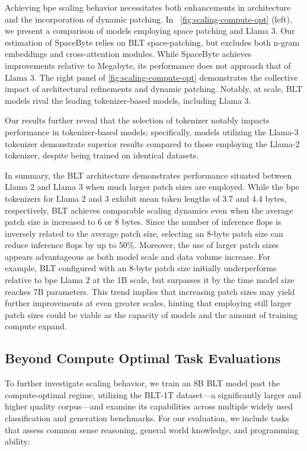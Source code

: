Achieving bpe scaling behavior necessitates both enhancements in architecture and the incorporation of dynamic patching. In ~\autoref{fig:scaling-compute-opt} (left), we present a comparison of models employing space patching and Llama 3. Our estimation of SpaceByte \citep{slagle2024spacebyte} relies on {\textsc BLT} space-patching, but excludes both n-gram embeddings and cross-attention modules. While SpaceByte achieves improvements relative to Megabyte, its performance does not approach that of Llama 3. The right panel of \autoref{fig:scaling-compute-opt} demonstrates the collective impact of architectural refinements and dynamic patching. Notably, at scale, {\textsc BLT} models rival the leading tokenizer-based models, including Llama 3.

Our results further reveal that the selection of tokenizer notably impacts performance in tokenizer-based models; specifically, models utilizing the Llama-3 tokenizer demonstrate superior results compared to those employing the Llama-2 tokenizer, despite being trained on identical datasets.

In summary, the {\textsc BLT} architecture demonstrates performance situated between Llama 2 and Llama 3 when much larger patch sizes are employed. While the bpe tokenizers for Llama 2 and 3 exhibit mean token lengths of 3.7 and 4.4 bytes, respectively, {\textsc BLT} achieves comparable scaling dynamics even when the average patch size is increased to 6 or 8 bytes. Since the number of inference flops is inversely related to the average patch size, selecting an 8-byte patch size can reduce inference flops by up to 50\%. Moreover, the use of larger patch sizes appears advantageous as both model scale and data volume increase. For example, {\textsc BLT} configured with an 8-byte patch size initially underperforms relative to bpe Llama 2 at the 1B scale, but surpasses it by the time model size reaches 7B parameters. This trend implies that increasing patch sizes may yield further improvements at even greater scales, hinting that employing still larger patch sizes could be viable as the capacity of models and the amount of training compute expand.

\subsection{Beyond Compute Optimal Task Evaluations}
\label{section:evals}
To further investigate scaling behavior, we train an 8B {\textsc BLT} model past the compute-optimal regime, utilizing the {\textsc BLT}-1T dataset—a significantly larger and higher quality corpus—and examine its capabilities across multiple widely used classification and generation benchmarks. For our evaluation, we include tasks that assess common sense reasoning, general world knowledge, and programming ability:
